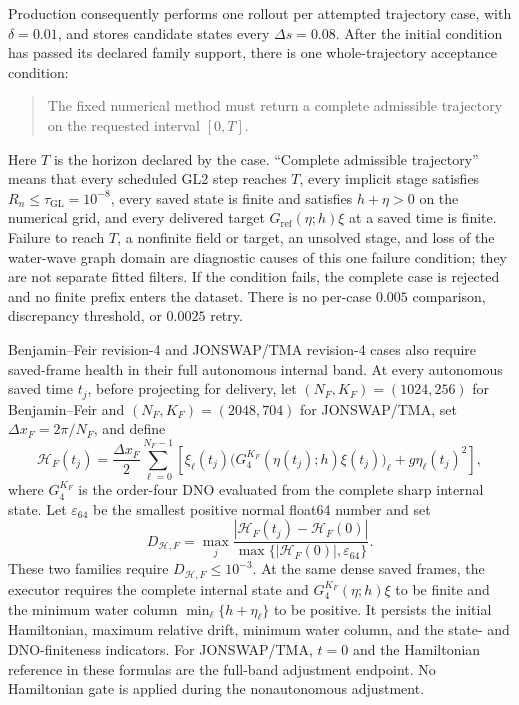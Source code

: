 \documentclass[11pt]{article}
\begin{document}
Production consequently performs one rollout per attempted trajectory case,
with $\delta=0.01$, and stores candidate states every $\Delta s=0.08$.
After the initial condition has passed its declared family support, there is
one whole-trajectory acceptance condition:
\begin{quote}
The fixed numerical method must return a complete admissible trajectory on
the requested interval $[0,T]$.
\end{quote}
Here $T$ is the horizon declared by the case.  ``Complete admissible
trajectory'' means that every scheduled GL2 step reaches $T$, every implicit
stage satisfies $R_n\leq\tau_{\mathrm{GL}}=10^{-8}$, every saved state is
finite and satisfies $h+\eta>0$ on the numerical grid, and every delivered
target $G_{\mathrm{ref}}(\eta;h)\xi$ at a saved time is finite.  Failure to
reach $T$, a nonfinite field or target, an unsolved stage, and loss of the
water-wave graph domain are diagnostic causes of this one failure condition;
they are not separate fitted filters.  If the condition fails, the complete
case is rejected and no finite prefix enters the dataset.  There is no
per-case $0.005$ comparison, discrepancy threshold, or $0.0025$ retry.

Benjamin--Feir revision-4 and JONSWAP/TMA revision-4 cases also require saved-frame
health in their full autonomous internal band.  At every autonomous saved
time \(t_j\), before projecting for delivery, let
\((N_F,K_F)=(1024,256)\) for Benjamin--Feir and
\((N_F,K_F)=(2048,704)\) for JONSWAP/TMA, set
\(\Delta x_F=2\pi/N_F\), and define
\begin{equation}
  \mathcal H_{F}(t_j)
  =\frac{\Delta x_F}{2}\sum_{\ell=0}^{N_F-1}
    \left[
      \xi_\ell(t_j)
      \bigl(G^{K_F}_4(\eta(t_j);h)\xi(t_j)\bigr)_\ell
      +g\eta_\ell(t_j)^2
    \right],
  \label{eq:production-internal-hamiltonian}
\end{equation}
where \(G^{K_F}_4\) is the order-four DNO evaluated from the complete sharp
internal state.  Let \(\varepsilon_{64}\) be the smallest positive normal
float64 number and set
\begin{equation}
  D_{\mathcal H,F}
  =\max_j
    \frac{
      |\mathcal H_F(t_j)-\mathcal H_F(0)|
    }{
      \max\{|\mathcal H_F(0)|,\varepsilon_{64}\}
    }.
  \label{eq:production-internal-hamiltonian-drift}
\end{equation}
These two families require
\(D_{\mathcal H,F}\leq10^{-3}\).  At the same dense saved frames, the
executor requires the complete internal state and
\(G^{K_F}_4(\eta;h)\xi\) to be finite and the minimum water column
\(\min_\ell\{h+\eta_\ell\}\) to be positive.  It persists the initial
Hamiltonian, maximum relative drift, minimum water column, and the state- and
DNO-finiteness indicators.  For JONSWAP/TMA, \(t=0\) and the Hamiltonian
reference in these formulas are the full-band adjustment endpoint.  No
Hamiltonian gate is applied during the nonautonomous adjustment.
\end{document}
